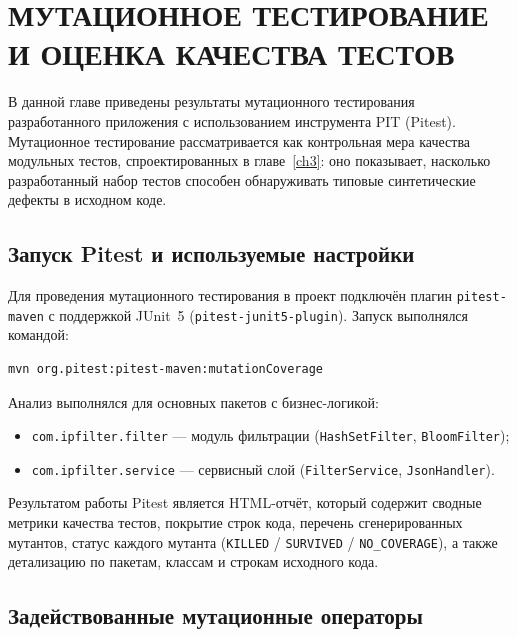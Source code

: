 \chapter{МУТАЦИОННОЕ ТЕСТИРОВАНИЕ И ОЦЕНКА КАЧЕСТВА ТЕСТОВ} \label{ch4}

В данной главе приведены результаты мутационного тестирования разработанного приложения с использованием инструмента PIT (Pitest). Мутационное тестирование рассматривается как контрольная мера качества модульных тестов, спроектированных в главе~\ref{ch3}: оно показывает, насколько разработанный набор тестов способен обнаруживать типовые синтетические дефекты в исходном коде.

\section{Запуск Pitest и используемые настройки} \label{ch4:sec0}

Для проведения мутационного тестирования в проект подключён плагин \texttt{pitest-maven} с поддержкой JUnit~5 (\texttt{pitest-junit5-plugin}). Запуск выполнялся командой:
\begin{verbatim}
mvn org.pitest:pitest-maven:mutationCoverage
\end{verbatim}

Анализ выполнялся для основных пакетов с бизнес-логикой:
\begin{itemize}
    \item \texttt{com.ipfilter.filter} --- модуль фильтрации (\texttt{HashSetFilter}, \texttt{BloomFilter});
    \item \texttt{com.ipfilter.service} --- сервисный слой (\texttt{FilterService}, \texttt{JsonHandler}).
\end{itemize}

Результатом работы Pitest является HTML-отчёт, который содержит сводные метрики качества тестов, покрытие строк кода, перечень сгенерированных мутантов, статус каждого мутанта (\texttt{KILLED} / \texttt{SURVIVED} / \texttt{NO\_COVERAGE}), а также детализацию по пакетам, классам и строкам исходного кода.

\section{Задействованные мутационные операторы} \label{ch4:sec1}

